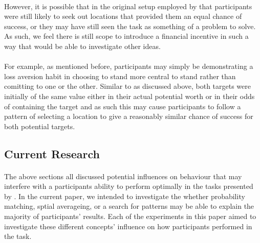 \documentclass[12pt]{article}
\begin{document}
\paragraph{} However, it is possible that in the original setup employed by \cite{morvan2012human} that participants were still likely to seek out locations that provided them an equal chance of success, or they may have still seen the task as something of a problem to solve. As such, we feel there is still scope to introduce a financial incentive in such a way that would be able to investigate other ideas. 

\paragraph{} For example, as mentioned before, participants may simply be demonstrating a loss aversion habit in choosing to stand more central to stand rather than comitting to one or the other. Similar to as discussed above, both targets were initially of the same value either in their actual potential worth \citep{morvan2012human} or in their odds of containing the target \citep{clarke2015failure} and as such this may cause participants to follow a pattern of selecting a location to give a reasonably similar chance of success for both potential targets. 

\subsection*{Current Research}

\paragraph{} The above sections all discussed potential influences on behaviour that may interfere with a participants ability to perform optimally in the tasks presented by \cite{clarke2015failure}. In the current paper, we intended to investigate the whether probability matching, sptial averageing, or a search for patterns may be able to explain the majority of participants' results. Each of the experiments in this paper aimed to investigate these different concepts' influence on how participants performed in the task. 
\end{document}

